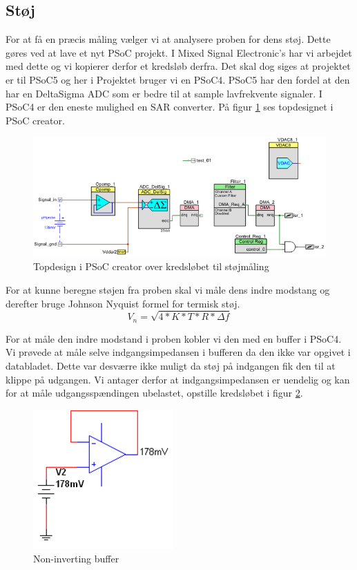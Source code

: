  

\subsection{Støj}

For at få en præcis måling vælger vi at analysere proben for dens støj. Dette gøres ved at lave et nyt PSoC projekt. I Mixed Signal Electronic's har vi arbejdet med dette og vi kopierer derfor et kredsløb derfra. Det skal dog siges at projektet er til PSoC5 og her i Projektet bruger vi en PSoC4. PSoC5 har den fordel at den har en DeltaSigma ADC som er bedre til at sample lavfrekvente signaler. I PSoC4 er den eneste mulighed en SAR converter. På figur \ref{photo:Topdesign_stoj} ses topdesignet i PSoC creator. 
 \begin{figure}[H]
	\centering 
	\includegraphics[scale=0.8]{HardwareArkitektur/Sensore/pH_probe_billeder/Topdesign_stoj.png}
	\caption{Topdesign i PSoC creator over kredsløbet til støjmåling}
	\label{photo:Topdesign_stoj}
\end{figure} 

For at kunne beregne støjen fra proben skal vi måle dens indre modstang og derefter bruge Johnson Nyquist formel for termisk støj. 
$$ V_n = \sqrt{4*K*T*R*\Delta f} $$

For at måle den indre modstand i proben kobler vi den med en buffer i PSoC4. Vi prøvede at måle selve indgangsimpedansen i bufferen da den ikke var opgivet i databladet. Dette var desværre ikke muligt da støj på indgangen fik den til at klippe på udgangen. Vi antager derfor at indgangsimpedansen er uendelig og kan for at måle udgangsspændingen ubelastet, opstille kredsløbet i figur \ref{photo:Non_inv_buf}. 

 \begin{figure}[H]
	\centering 
	\includegraphics[scale=1]{HardwareArkitektur/Sensore/pH_probe_billeder/Non_inverting_buffer.png}
	\caption{Non-inverting buffer}
	\label{photo:Non_inv_buf}
\end{figure} 

